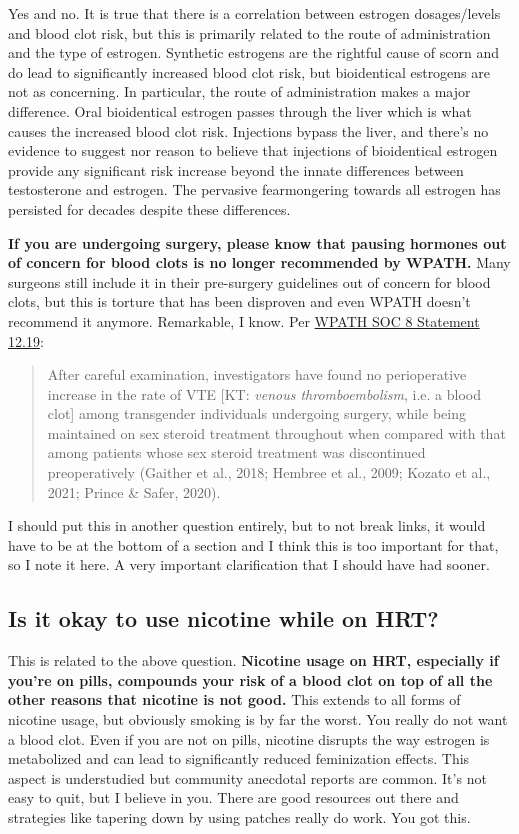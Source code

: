 \documentclass{article}
\begin{document}
Yes and no. It is true that there is a correlation between estrogen dosages/levels and blood clot risk, but this is primarily related to the route of administration and the type of estrogen. Synthetic estrogens are the rightful cause of scorn and do lead to significantly increased blood clot risk, but bioidentical estrogens are not as concerning. In particular, the route of administration makes a major difference. Oral bioidentical estrogen passes through the liver which is what causes the increased blood clot risk. Injections bypass the liver, and there's no evidence to suggest nor reason to believe that injections of bioidentical estrogen provide any significant risk increase beyond the innate differences between testosterone and estrogen. The pervasive fearmongering towards all estrogen has persisted for decades despite these differences.

\textbf{If you are undergoing surgery, please know that pausing hormones out of concern for blood clots is no longer recommended by WPATH.} Many surgeons still include it in their pre-surgery guidelines out of concern for blood clots, but this is torture that has been disproven and even WPATH doesn't recommend it anymore. Remarkable, I know. Per \href{https://www.tandfonline.com/doi/pdf/10.1080/26895269.2022.2100644}{WPATH SOC 8 Statement 12.19}: \blockquote{After careful examination, investigators have found no perioperative increase in the rate of VTE [KT: \textit{venous thromboembolism}, i.e. a blood clot] among transgender individuals undergoing surgery, while being maintained on sex steroid treatment throughout when compared with that among patients whose sex steroid treatment was discontinued preoperatively (Gaither et al., 2018; Hembree et al., 2009; Kozato et al., 2021; Prince \& Safer, 2020).} I should put this in another question entirely, but to not break links, it would have to be at the bottom of a section and I think this is too important for that, so I note it here. A very important clarification that I should have had sooner.

\subsection{Is it okay to use nicotine while on HRT?}\label{11-2}

This is related to the above question. \textbf{Nicotine usage on HRT, especially if you’re on pills, compounds your risk of a blood clot on top of all the other reasons that nicotine is not good.} This extends to all forms of nicotine usage, but obviously smoking is by far the worst. You really do not want a blood clot. Even if you are not on pills, nicotine disrupts the way estrogen is metabolized and can lead to significantly reduced feminization effects. This aspect is understudied but community anecdotal reports are common. It’s not easy to quit, but I believe in you. There are good resources out there and strategies like tapering down by using patches really do work. You got this.
\end{document}
